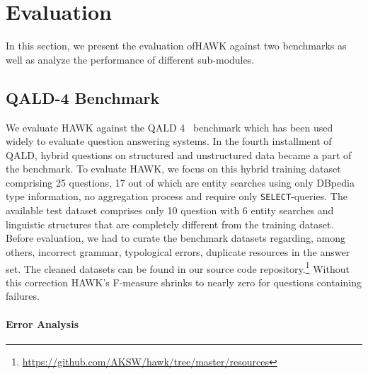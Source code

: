 



\section{Evaluation}
\label{chahawk:sec:evaluation}

In this section, we present the evaluation ofHAWK against two benchmarks as well as analyze the performance of different sub-modules.

\subsection{QALD-4 Benchmark}

We evaluate HAWK against the \ac{QALD} 4~\cite{qald4} benchmark which has been used widely to evaluate question answering systems. 
In the fourth installment of \ac{QALD}, hybrid questions on structured and unstructured data became a part of the benchmark.
To evaluate HAWK, we focus on this hybrid training dataset comprising 25 questions, 17 out of which are entity searches using only DBpedia type information, no aggregation process and require only \texttt{SELECT}-queries. 
The available test dataset comprises only 10 question with 6 entity searches and linguistic structures that are completely different from the training dataset.
Before evaluation, we had to curate the benchmark datasets regarding, among others, incorrect grammar, typological errors, duplicate resources in the answer set.
The cleaned datasets can be found in our source code repository.\footnote{\url{https://github.com/AKSW/hawk/tree/master/resources}}
Without this correction HAWK's F-measure shrinks to nearly zero for questions containing failures.

\paragraph{Error Analysis}

